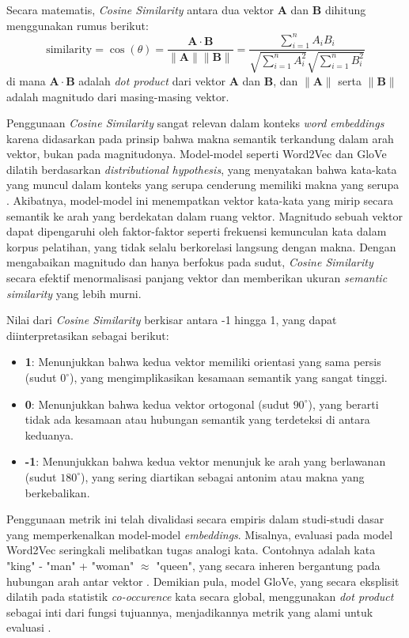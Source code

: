 Secara matematis, \textit{Cosine Similarity} antara dua vektor $\mathbf{A}$ dan $\mathbf{B}$ dihitung menggunakan rumus berikut:
$$\text{similarity} = \cos(\theta) = \frac{\mathbf{A} \cdot \mathbf{B}}{\|\mathbf{A}\| \|\mathbf{B}\|} = \frac{\sum_{i=1}^{n} A_i B_i}{\sqrt{\sum_{i=1}^{n} A_i^2} \sqrt{\sum_{i=1}^{n} B_i^2}}$$
di mana $\mathbf{A} \cdot \mathbf{B}$ adalah \textit{dot product} dari vektor $\mathbf{A}$ dan $\mathbf{B}$, dan $\|\mathbf{A}\|$ serta $\|\mathbf{B}\|$ adalah magnitudo dari masing-masing vektor.

Penggunaan \textit{Cosine Similarity} sangat relevan dalam konteks \textit{word embeddings} karena didasarkan pada prinsip bahwa makna semantik terkandung dalam arah vektor, bukan pada magnitudonya. Model-model seperti Word2Vec dan GloVe dilatih berdasarkan \textit{distributional hypothesis}, yang menyatakan bahwa kata-kata yang muncul dalam konteks yang serupa cenderung memiliki makna yang serupa \parencite{firth1957synopsis}. Akibatnya, model-model ini menempatkan vektor kata-kata yang mirip secara semantik ke arah yang berdekatan dalam ruang vektor. Magnitudo sebuah vektor dapat dipengaruhi oleh faktor-faktor seperti frekuensi kemunculan kata dalam korpus pelatihan, yang tidak selalu berkorelasi langsung dengan makna. Dengan mengabaikan magnitudo dan hanya berfokus pada sudut, \textit{Cosine Similarity} secara efektif menormalisasi panjang vektor dan memberikan ukuran \textit{semantic similarity} yang lebih murni.

Nilai dari \textit{Cosine Similarity} berkisar antara -1 hingga 1, yang dapat diinterpretasikan sebagai berikut:
\begin{itemize}
	\item \textbf{1}: Menunjukkan bahwa kedua vektor memiliki orientasi yang sama persis (sudut $0^\circ$), yang mengimplikasikan kesamaan semantik yang sangat tinggi.
	\item \textbf{0}: Menunjukkan bahwa kedua vektor ortogonal (sudut $90^\circ$), yang berarti tidak ada kesamaan atau hubungan semantik yang terdeteksi di antara keduanya.
	\item \textbf{-1}: Menunjukkan bahwa kedua vektor menunjuk ke arah yang berlawanan (sudut $180^\circ$), yang sering diartikan sebagai antonim atau makna yang berkebalikan.
\end{itemize}

Penggunaan metrik ini telah divalidasi secara empiris dalam studi-studi dasar yang memperkenalkan model-model \textit{embeddings}. Misalnya, evaluasi pada model Word2Vec seringkali melibatkan tugas analogi kata. Contohnya adalah kata "king" - "man" + "woman" $\approx$ "queen", yang secara inheren bergantung pada hubungan arah antar vektor \parencite{mikolov2013efficient}. Demikian pula, model GloVe, yang secara eksplisit dilatih pada statistik \textit{co-occurence} kata secara global, menggunakan \textit{dot product} sebagai inti dari fungsi tujuannya, menjadikannya metrik yang alami untuk evaluasi \parencite{pennington2014glove}.